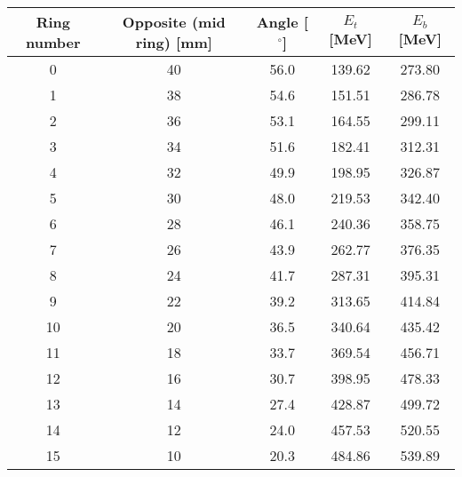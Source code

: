 \begin{tabular}{ccccc}
\hline
Ring number  &  Opposite (mid ring) [mm] &  Angle [$^\circ$]  &  $E_t$ [MeV]  &  $E_b$ [MeV]  \\
\hline
0            &  40                       &  56.0              &  139.62       &  273.80       \\
1            &  38                       &  54.6              &  151.51       &  286.78       \\
2            &  36                       &  53.1              &  164.55       &  299.11       \\
3            &  34                       &  51.6              &  182.41       &  312.31       \\
4            &  32                       &  49.9              &  198.95       &  326.87       \\
5            &  30                       &  48.0              &  219.53       &  342.40       \\
6            &  28                       &  46.1              &  240.36       &  358.75       \\
7            &  26                       &  43.9              &  262.77       &  376.35       \\
8            &  24                       &  41.7              &  287.31       &  395.31       \\
9            &  22                       &  39.2              &  313.65       &  414.84       \\
10           &  20                       &  36.5              &  340.64       &  435.42       \\
11           &  18                       &  33.7              &  369.54       &  456.71       \\
12           &  16                       &  30.7              &  398.95       &  478.33       \\
13           &  14                       &  27.4              &  428.87       &  499.72       \\
14           &  12                       &  24.0              &  457.53       &  520.55       \\
15           &  10                       &  20.3              &  484.86       &  539.89       \\
\hline
\end{tabular}